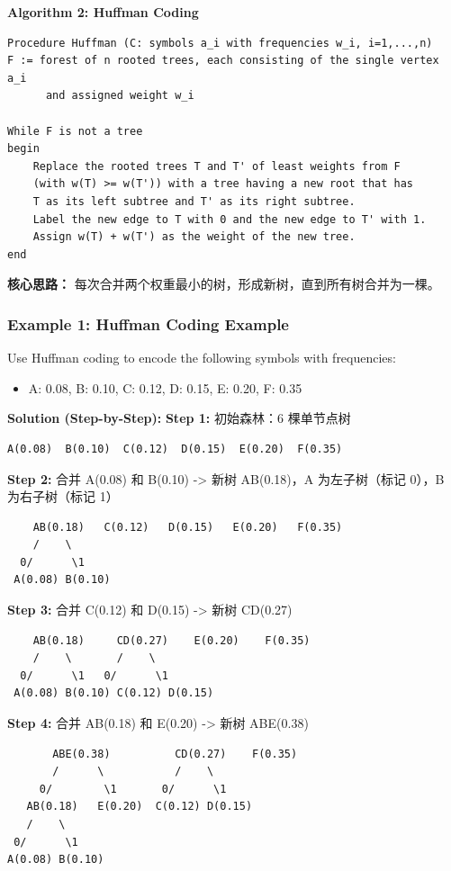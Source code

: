 \documentclass[10pt,a4paper,openany]{ctexbook}
\theoremstyle{definition}
\theoremstyle{remark}
\begin{document}
\textbf{Algorithm 2: Huffman Coding}
{\footnotesize\begin{verbatim}
Procedure Huffman (C: symbols a_i with frequencies w_i, i=1,...,n)
F := forest of n rooted trees, each consisting of the single vertex a_i
      and assigned weight w_i

While F is not a tree
begin
    Replace the rooted trees T and T' of least weights from F
    (with w(T) >= w(T')) with a tree having a new root that has
    T as its left subtree and T' as its right subtree.
    Label the new edge to T with 0 and the new edge to T' with 1.
    Assign w(T) + w(T') as the weight of the new tree.
end
\end{verbatim}}

\textbf{核心思路：} 每次合并两个权重最小的树，形成新树，直到所有树合并为一棵。
\vspace{-2pt}

\subsubsection{Example 1: Huffman Coding Example}

Use Huffman coding to encode the following symbols with frequencies:
\begin{itemize}
\item A: 0.08, B: 0.10, C: 0.12, D: 0.15, E: 0.20, F: 0.35

\end{itemize}

\textbf{Solution (Step-by-Step):}
\textbf{Step 1:} 初始森林：6 棵单节点树
{\footnotesize\begin{verbatim}
A(0.08)  B(0.10)  C(0.12)  D(0.15)  E(0.20)  F(0.35)
\end{verbatim}}

\textbf{Step 2:} 合并 A(0.08) 和 B(0.10) -> 新树 AB(0.18)，A 为左子树（标记 0），B 为右子树（标记 1）
{\footnotesize\begin{verbatim}
    AB(0.18)   C(0.12)   D(0.15)   E(0.20)   F(0.35)
    /    \
  0/      \1
 A(0.08) B(0.10)
\end{verbatim}}

\textbf{Step 3:} 合并 C(0.12) 和 D(0.15) -> 新树 CD(0.27)
{\footnotesize\begin{verbatim}
    AB(0.18)     CD(0.27)    E(0.20)    F(0.35)
    /    \       /    \
  0/      \1   0/      \1
 A(0.08) B(0.10) C(0.12) D(0.15)
\end{verbatim}}

\textbf{Step 4:} 合并 AB(0.18) 和 E(0.20) -> 新树 ABE(0.38)
{\footnotesize\begin{verbatim}
       ABE(0.38)          CD(0.27)    F(0.35)
       /      \           /    \
     0/        \1       0/      \1
   AB(0.18)   E(0.20)  C(0.12) D(0.15)
   /    \
 0/      \1
A(0.08) B(0.10)
\end{verbatim}}
\end{document}
